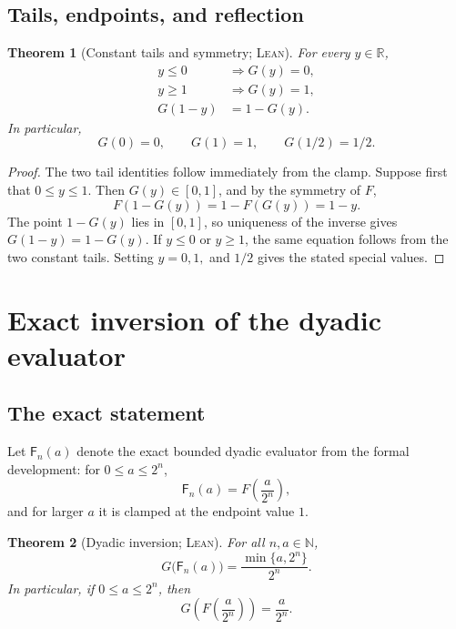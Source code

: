 \documentclass[11pt,oneside]{article}
\newtheorem{theorem}{Theorem}[section]
\theoremstyle{definition}
\theoremstyle{remark}
\newcommand{\R}{\mathbb R}
\newcommand{\N}{\mathbb N}
\newcommand{\InvF}{G}
\newcommand{\Formalized}{\textsc{Lean}}
\begin{document}
\subsection{Tails, endpoints, and reflection}

\begin{theorem}[Constant tails and symmetry; \Formalized]
\label{thm:inverse-symmetry}
For every $y\in\R$,
\begin{align}
 y\leq0&\Longrightarrow \InvF(y)=0,\\
 y\geq1&\Longrightarrow \InvF(y)=1,\\
 \InvF(1-y)&=1-\InvF(y). \label{eq:inv-reflection}
\end{align}
In particular,
\[
 \InvF(0)=0,\qquad \InvF(1)=1,\qquad \InvF(1/2)=1/2.
\]
\end{theorem}

\begin{proof}
The two tail identities follow immediately from the clamp.  Suppose first
that $0\leq y\leq1$.  Then $\InvF(y)\in[0,1]$, and by the symmetry of $F$,
\[
 F(1-\InvF(y))
   =1-F(\InvF(y))
   =1-y.
\]
The point $1-\InvF(y)$ lies in $[0,1]$, so uniqueness of the inverse gives
$\InvF(1-y)=1-\InvF(y)$.  If $y\leq0$ or $y\geq1$, the same equation follows
from the two constant tails.  Setting $y=0,1,$ and $1/2$ gives the stated
special values.
\end{proof}

\section{Exact inversion of the dyadic evaluator}
\label{sec:dyadic-inverse}

\subsection{The exact statement}

Let $\mathsf F_n(a)$ denote the exact bounded dyadic evaluator from the
formal development: for $0\leq a\leq2^n$,
\[
 \mathsf F_n(a)=F\!\left(\frac{a}{2^n}\right),
\]
and for larger $a$ it is clamped at the endpoint value $1$.

\begin{theorem}[Dyadic inversion; \Formalized]
\label{thm:dyadic-inversion}
For all $n,a\in\N$,
\[
 \InvF\bigl(\mathsf F_n(a)\bigr)
 =\frac{\min\{a,2^n\}}{2^n}.
\]
In particular, if $0\leq a\leq2^n$, then
\[
 \InvF\!\left(F\!\left(\frac a{2^n}\right)\right)=\frac a{2^n}.
\]
\end{theorem}
\end{document}
